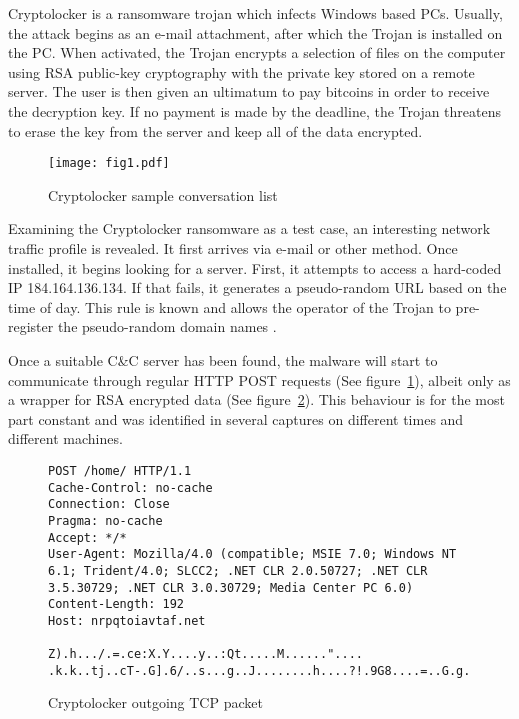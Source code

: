 \documentclass[13pt,journal,compsoc,onecolumn]{IEEEtran}
\begin{document}
Cryptolocker is a ransomware trojan which infects Windows based PCs. Usually, the attack begins as an e-mail attachment, after which the Trojan is installed on the PC. When activated, the Trojan encrypts a selection of files on the computer using RSA public-key cryptography with the private key stored on a remote server. The user is then given an ultimatum to pay bitcoins in order to receive the decryption key. If no payment is made by the deadline, the Trojan threatens to erase the key from the server and keep all of the data encrypted.

\begin{figure}[!ht]
 \centering
 \texttt{[image: fig1.pdf]}
 \caption{Cryptolocker sample conversation list\label{fig:cryptolockerconv}}
\end{figure} 

Examining the Cryptolocker ransomware as a test case, an interesting network traffic profile is revealed. It first arrives via e-mail or other method. Once installed, it begins looking for a server. First, it attempts to access a hard-coded IP 184.164.136.134. If that fails, it generates a pseudo-random URL based on the time of day. This rule is known and allows the operator of the Trojan to pre-register the pseudo-random domain names \cite{EMS13}.

Once a suitable C\&C server has been found, the malware will start to communicate through regular HTTP POST requests (See figure~\ref{fig:cryptolockerconv}), albeit only as a wrapper for RSA encrypted data (See figure~\ref{fig:cryptolockerpacket}).
This behaviour is for the most part constant and was identified in several captures on different times and different machines.
\begin{figure}[!ht]
\lstset{basicstyle=\scriptsize,stringstyle=\ttfamily}
\begin{lstlisting}[frame=single,firstline=1,lastline=11]
POST /home/ HTTP/1.1
Cache-Control: no-cache
Connection: Close
Pragma: no-cache
Accept: */*
User-Agent: Mozilla/4.0 (compatible; MSIE 7.0; Windows NT 6.1; Trident/4.0; SLCC2; .NET CLR 2.0.50727; .NET CLR 3.5.30729; .NET CLR 3.0.30729; Media Center PC 6.0)
Content-Length: 192
Host: nrpqtoiavtaf.net

Z).h.../.=.ce:X.Y....y..:Qt.....M......"....
.k.k..tj..cT-.G].6/..s...g..J........h....?!.9G8....=..G.g..P<U.n.........rM...\o.K?./M|......L.d).-.......E...1.i..o.i.Dc..g.`..b.5Z....E......v.z
\end{lstlisting}
\caption{Cryptolocker outgoing TCP packet\label{fig:cryptolockerpacket}}
\end{figure}
\end{document}

